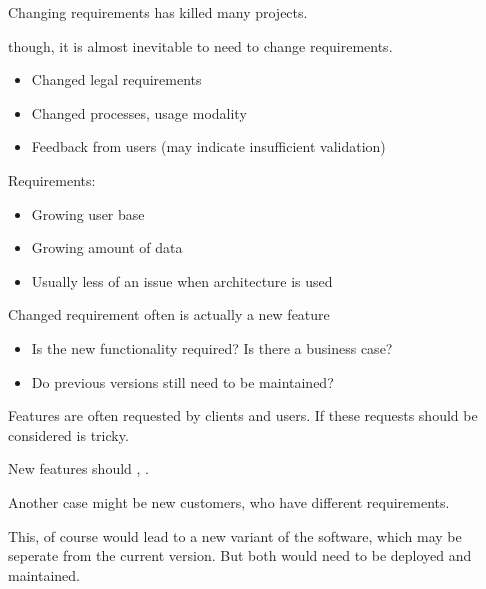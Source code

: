 \documentclass[
    ../../Software_Engineering_Summary.tex,
]
{subfiles}
\begin{document}
\begin{defbox}
	Changing requirements  has killed many projects. 

     though, it is almost inevitable to need to change requirements.
    \begin{itemize}
        \item Changed legal requirements
        \item Changed processes, usage modality
        \item Feedback from users (may indicate insufficient validation)
    \end{itemize}

     Requirements:
    \begin{itemize}
        \item Growing user base
        \item Growing amount of data
        \item Usually less of an issue when  architecture is used
    \end{itemize}

    Changed requirement often is actually a new feature
    \begin{itemize}
        \item Is the new functionality required? Is there a business case?
        \item Do previous versions still need to be maintained?
    \end{itemize}
\end{defbox}

\begin{defbox}
	Features are often requested by clients and users. If these requests should be considered is tricky.

    New features should , .

    Another case might be new customers, who have different requirements.

    This, of course would lead to a new variant of the software, which may be seperate from the current version. But both would need to be deployed and maintained.
\end{defbox}
\end{document}

